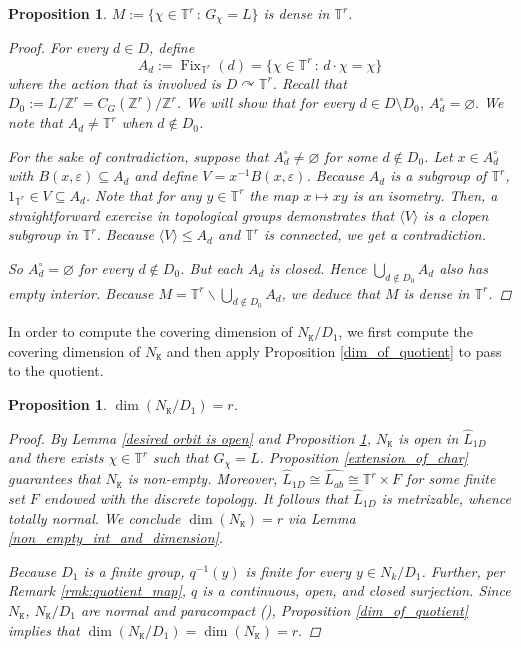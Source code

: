 \documentclass[11pt, twoside]{amsart}
\newcommand{\tn}{\mathbb{T}}
\newcommand{\zn}{\mathbb{Z}}
\newcommand{\sse}{\subseteq}
\newcommand{\mt}{\mathtt}
\newcommand{\wh}{\widehat}
\newtheorem{prop}[thm]{Proposition}
\theoremstyle{definition}
\newcommand{\on}{\operatorname}
\newcommand{\B}{\mathbb}
\newcommand{\T}{\B{T}}
\newcommand{\TT}{\mathbb{T}}
\begin{document}
\begin{prop}\label{density}
    $M:=\{\chi\in \TT^r \,\colon\, G_{\chi}=L\}$ is dense in $\TT^r$.
    \begin{proof}
     
 For every $d\in D$, define
\[A_d:=\on{Fix}_{\T^r}(d)=\{\chi\in \TT^r\,\colon\, d\cdot \chi=\chi\}\]
where the action that is involved is $D\curvearrowright \TT^r$.
Recall that $D_0:=L\slash \zn^r=C_G(\zn^r)\slash \zn^r$. We will show that for every $d\in D\setminus D_0$, $A_d^{\circ}=\varnothing.$ We note that $A_d\neq \tn^r$ when $d\not\in D_0$. \par

For the sake of contradiction, suppose that $A_d^{\circ}\neq\varnothing$ for some $d\notin D_0$. Let $x\in A_d^\circ$ with $B(x,\varepsilon)\sse A_d$ and define $V=x^{-1}B(x,\varepsilon)$. Because $A_d$ is a subgroup of $\TT^r$, $1_{\TT^r}\in V\sse A_d$. Note that for any $y\in \TT^r$ the map $x\mapsto xy$ is an isometry. Then, a straightforward exercise in topological groups demonstrates that $\langle V\rangle$ is a clopen subgroup in $\T^r$. Because $\langle V\rangle \leq A_d$ and $\TT^r$ is connected, we get a contradiction.

So $A_d^{\circ}=\varnothing$ for every $d\notin D_0$.  But each $A_d$ is closed. Hence $\bigcup_{d\notin D_0}A_d$ also has empty interior. Because $M=\TT^r\backslash \bigcup_{d\notin D_0}A_d$, we deduce that $M$ is dense in $\TT^r$. \qedhere


    \end{proof}
\end{prop}


In order to compute the covering dimension of $N_{\mt{K}}/D_1$, we first compute the covering dimension of $N_{\mt{K}}$ and then apply Proposition \ref{dim_of_quotient} to pass to the quotient.

\begin{prop}\label{dim_N_k=r}
    $\dim(N_{\mt{K}}/D_1)=r$.
    \begin{proof}
        By Lemma \ref{desired orbit is open} and Proposition \ref{density}, $N_{\mt{K}}$ is open in $\wh{L}_{1D}$ and there exists $\chi\in \TT^r$ such that $G_{\chi}=L$.  Proposition \ref{extension_of_char} guarantees that $N_{\mt{K}}$ is non-empty. Moreover, $\wh{L}_{1D}\cong \widehat{L_{ab}}\cong \TT^r \times F$ for some finite set $F$ endowed with the discrete topology. It follows that $\wh{L}_{1D}$ is metrizable, whence totally normal. We conclude $\dim(N_{\mt{K}})=r$ via Lemma \ref{non_empty_int_and_dimension}. 
        
        Because $D_1$ is a finite group, $q^{-1}(y)$ is finite for every $y\in N_k/D_1$. Further, per Remark \ref{rmk:quotient_map}, $q$ is a continuous, open, and closed surjection. Since $N_{\mt{K}}$, $N_{\mt{K}}/D_1$ are normal and paracompact (\cite[1.5.20 and 5.1.33]{engelking_topology}), Proposition \ref{dim_of_quotient} implies that $\dim(N_{\mt{K}}/D_1)=\dim(N_{\mt{K}})=r.$
    \end{proof}
\end{prop}
\end{document}
